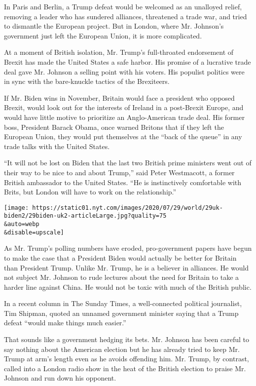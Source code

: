 In Paris and Berlin, a Trump defeat would be welcomed as an unalloyed
relief, removing a leader who has sundered alliances, threatened a trade
war, and tried to dismantle the European project. But in London, where
Mr. Johnson's government just left the European Union, it is more
complicated.

At a moment of British isolation, Mr. Trump's full-throated endorsement
of Brexit has made the United States a safe harbor. His promise of a
lucrative trade deal gave Mr. Johnson a selling point with his voters.
His populist politics were in sync with the bare-knuckle tactics of the
Brexiteers.

If Mr. Biden wins in November, Britain would face a president who
opposed Brexit, would look out for the interests of Ireland in a
post-Brexit Europe, and would have little motive to prioritize an
Anglo-American trade deal. His former boss, President Barack Obama, once
warned Britons that if they left the European Union, they would put
themselves at the ``back of the queue'' in any trade talks with the
United States.

``It will not be lost on Biden that the last two British prime ministers
went out of their way to be nice to and about Trump,'' said Peter
Westmacott, a former British ambassador to the United States. ``He is
instinctively comfortable with Brits, but London will have to work on
the relationship.''

\texttt{[image: https://static01.nyt.com/images/2020/07/29/world/29uk-biden2/29biden-uk2-articleLarge.jpg?quality=75\\\&auto=webp\\\&disable=upscale]}

As Mr. Trump's polling numbers have eroded, pro-government papers have
begun to make the case that a President Biden would actually be better
for Britain than President Trump. Unlike Mr. Trump, he is a believer in
alliances. He would not subject Mr. Johnson to rude lectures about the
need for Britain to take a harder line against China. He would not be
toxic with much of the British public.

In a recent column in The Sunday Times, a well-connected political
journalist, Tim Shipman, quoted an unnamed government minister saying
that a Trump defeat ``would make things much easier.''

That sounds like a government hedging its bets. Mr. Johnson has been
careful to say nothing about the American election but he has already
tried to keep Mr. Trump at arm's length even as he avoids offending him.
Mr. Trump, by contrast, called into a London radio show in the heat of
the British election to praise Mr. Johnson and run down his opponent.

